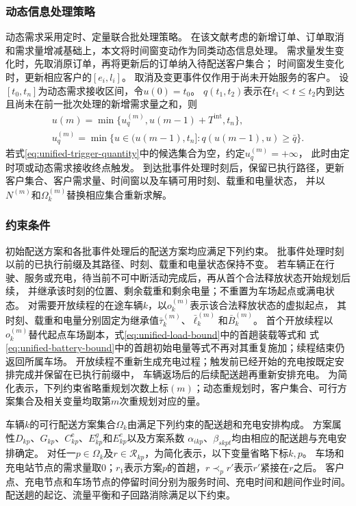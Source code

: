 \documentclass{setp-new}
\begin{document}
\subsubsection{动态信息处理策略}

动态需求采用定时、定量联合批处理策略\cite{ref:71}。
在该文献考虑的新增订单、订单取消和需求量增减基础上，本文将时间窗变动作为同类动态信息处理。
需求量发生变化时，先取消原订单，再将更新后的订单纳入待配送客户集合；
时间窗发生变化时，更新相应客户的$[e_i,l_i]$。
取消及变更事件仅作用于尚未开始服务的客户。
设$[t_0,t_n]$为动态需求接收区间，令$u(0)=t_0$。
$q(t_1,t_2)$表示在$t_1<t\le t_2$内到达且尚未在前一批次处理的新增需求量之和，则
\begin{gather}
u(m)
=\min\{u_q^{(m)},u(m-1)+T^{\mathrm{int}},t_n\},
\label{eq:unified-trigger-time}\\
u_q^{(m)}
=\min\{u\in(u(m-1),t_n]:q(u(m-1),u)\ge\bar q\}.
\label{eq:unified-trigger-quantity}
\end{gather}
若式\eqref{eq:unified-trigger-quantity}中的候选集合为空，约定$u_q^{(m)}=+\infty$，
此时由定时项或动态需求接收终点触发。
到达批事件处理时刻后，保留已执行路径，更新客户集合、客户需求量、时间窗以及车辆可用时刻、载重和电量状态，
并以$N^{(m)}$和$\Omega_k^{(m)}$替换相应集合重新求解。

\subsubsection{约束条件}

初始配送方案和各批事件处理后的配送方案均应满足下列约束。
批事件处理时刻以前的已执行前缀及其路径、时刻、载重和电量状态保持不变。
若车辆正在行驶、服务或充电，待当前不可中断活动完成后，再从首个合法释放状态开始规划后续，
并继承该时刻的位置、剩余载重和剩余电量；不重置为车场起点或满电状态。
对需要开放续程的在途车辆$k$，以$o_k^{(m)}$表示该合法释放状态的虚拟起点，
其时刻、载重和电量分别固定为继承值$\bar\tau_k^{(m)}$、$\bar\ell_k^{(m)}$和$\bar B_k^{(m)}$。
首个开放续程以$o_k^{(m)}$替代起点车场副本，式\eqref{eq:unified-load-bound}中的首趟装载等式和
式\eqref{eq:unified-battery-bound}中的首趟初始电量等式不再对其重复施加；续程结束仍返回所属车场。
开放续程不重新生成充电过程；触发前已经开始的充电按既定安排完成并保留在已执行前缀中，
车辆返场后的后续配送趟再重新安排充电。
为简化表示，下列约束省略重规划次数上标$(m)$；动态重规划时，客户集合、可行方案集合及相关变量均取第$m$次重规划对应的量。

车辆$k$的可行配送方案集合$\Omega_k$由满足下列约束的配送趟和充电安排构成。
方案属性$D_{kp}$、$G_{kp}$、$C_{kp}^{\mathrm e}$、$E_{kp}^{g}$和$E_{kp}^{e}$以及方案系数
$\alpha_{ikp}$、$\beta_{skpt}$均由相应的配送趟与充电安排确定。
对任一$p\in\Omega_k$及$r\in\mathcal R_{kp}$，为简化表示，以下变量省略下标$k,p$。
车场和充电站节点的需求量取0；$r_1$表示方案$p$的首趟，$r\prec_p r'$表示$r'$紧接在$r$之后。
客户点、充电节点和车场节点的停留时间分别为服务时间、充电时间和趟间作业时间。
配送趟的起讫、流量平衡和子回路消除满足以下约束。
\end{document}
